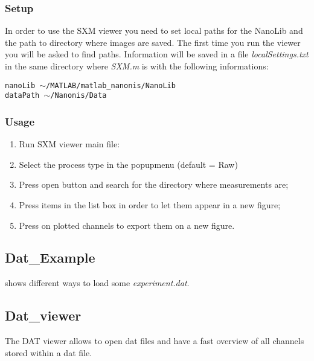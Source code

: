 \subsubsection*{Setup}
In order to use the SXM viewer you need to set local paths for the NanoLib and the path to directory where images are saved.
The first time you run the viewer you will be asked to find paths. 
Information will be saved in a file \emph{localSettings.txt} in the same directory  where \emph{SXM.m} is with the following informations:\\
\begin{minipage}{\textwidth}
	\setlength{\parindent}{15pt}
	\texttt{nanoLib	$\sim$/MATLAB/matlab\_nanonis/NanoLib}\\
	\indent \texttt{dataPath	$\sim$/Nanonis/Data}
\end{minipage}

\subsubsection*{Usage}
\begin{enumerate}
	\item Run SXM viewer main file: \\ 
	\item Select the process type in the popupmenu (default = Raw)
	\item Press open button and search for the directory where measurements are;
	\item Press items in the list box in order to let them appear in a new figure;
	\item Press on plotted channels to export them on a new figure.
\end{enumerate}

\subsection{Dat\_Example}
\bdf
\item[example\_Dat] shows different ways to load some \emph{experiment.dat}.
\edf

\subsection{Dat\_viewer}
\label{dat::viewer}
The DAT viewer allows to open dat files and have a fast overview of all channels stored within a dat file.

